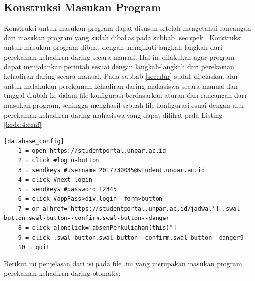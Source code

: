 \subsection{Konstruksi Masukan Program}
Konstruksi untuk masukan program dapat disusun setelah mengetahui rancangan dari masukan program yang sudah dibahas pada subbab \ref{sec:spek}. Konstruksi untuk masukan program dibuat dengan mengikuti langkah-langkah dari perekaman kehadiran daring secara manual. Hal ini dilakukan agar program dapat menjalankan perintah sesuai dengan langkah-langkah dari perekaman kehadiran daring secara manual. Pada subbab \ref{sec:alur} sudah dijelaskan alur untuk melakukan perekaman kehadiran daring mahasiswa secara manual dan tinggal diubah ke dalam file konfigurasi berdasarkan aturan dari rancangan dari masukan program, sehingga menghasil sebuah file konfigurasi esuai dengan alur perekaman kehadiran daring mahasiswa yang dapat dilihat pada Listing \ref{kode:4:conf}
\begin{lstlisting}[caption=Contoh \textit{file} .ini untuk Masukan Program Perekaman Kehadiran Daring Otomatis, label=kode:4:conf]
	[database_config]
	1 = open https://studentportal.unpar.ac.id
	2 = click #login-button
	3 = sendkeys #username 2017730035@student.unpar.ac.id 
	4 = click #next_login
	5 = sendkeys #password 12345
	6 = click #appPass>div.login__form>button
	7 = or a[href='https://studentportal.unpar.ac.id/jadwal'] .swal-button.swal-button--confirm.swal-button--danger
	8 = click a[onclick="absenPerkuliahan(this)"]
	9 = click .swal-button.swal-button--confirm.swal-button--danger9
	10 = quit
\end{lstlisting}
Berikut ini penjelasan dari isi pada file .ini yang merupakan masukan program perekaman kehadiran daring otomatis:
